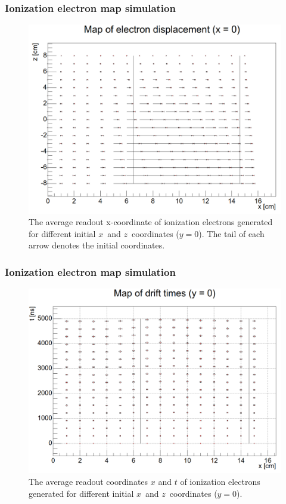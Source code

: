 \documentclass{beamer}
\begin{document}
	\begin{frame}
		\frametitle{Ionization electron map simulation}
		\begin{figure}
			\centering
			\includegraphics[height=0.65\textheight]{../images/map_xz.png}
			\caption{The average readout x-coordinate of ionization electrons generated for different initial $x$~and $z$~coordinates ($y=0$). The tail of each arrow denotes the initial coordinates.}
		\end{figure}
	\end{frame}
	\begin{frame}
		\frametitle{Ionization electron map simulation}
		\begin{figure}
			\centering
			\includegraphics[height=0.65\textheight]{../images/map_xt.png}
			\caption{The average readout coordinates $x$ and $t$ of ionization electrons generated for different initial $x$~and $z$~coordinates ($y=0$).}
		\end{figure}
	\end{frame}
\end{document}
